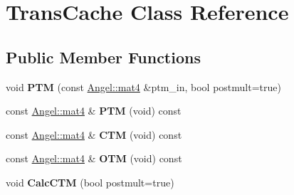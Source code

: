 \hypertarget{class_trans_cache}{\section{Trans\-Cache Class Reference}
\label{class_trans_cache}
}
\subsection*{Public Member Functions}
\begin{DoxyCompactItemize}
\item 
\hypertarget{class_trans_cache_a32a6714d87b953341ec5fa7eeb57c38f}{void {\bfseries P\-T\-M} (const \hyperlink{class_angel_1_1mat4}{Angel\-::mat4} \&ptm\-\_\-in, bool postmult=true)}\label{class_trans_cache_a32a6714d87b953341ec5fa7eeb57c38f}

\item 
\hypertarget{class_trans_cache_a7b425ff8ded5fb458e21ab4660785038}{const \hyperlink{class_angel_1_1mat4}{Angel\-::mat4} \& {\bfseries P\-T\-M} (void) const }\label{class_trans_cache_a7b425ff8ded5fb458e21ab4660785038}

\item 
\hypertarget{class_trans_cache_ac9396813c4f26840c9c5e825d2a56fef}{const \hyperlink{class_angel_1_1mat4}{Angel\-::mat4} \& {\bfseries C\-T\-M} (void) const }\label{class_trans_cache_ac9396813c4f26840c9c5e825d2a56fef}

\item 
\hypertarget{class_trans_cache_ac1ca33b96c384988bb7a46a250d441bd}{const \hyperlink{class_angel_1_1mat4}{Angel\-::mat4} \& {\bfseries O\-T\-M} (void) const }\label{class_trans_cache_ac1ca33b96c384988bb7a46a250d441bd}

\item 
\hypertarget{class_trans_cache_ae68bc1c7a2f813ae42e895c4b3914f06}{void {\bfseries Calc\-C\-T\-M} (bool postmult=true)}\label{class_trans_cache_ae68bc1c7a2f813ae42e895c4b3914f06}

\end{DoxyCompactItemize}
